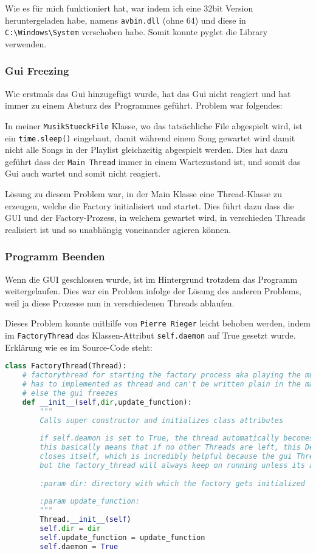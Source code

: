 Wie es für mich funktioniert hat, war indem ich eine 32bit Version heruntergeladen habe, namens \verb|avbin.dll| (ohne 64) und diese in \verb|C:\Windows\System| verschoben habe. Somit konnte pyglet die Library verwenden.

\clearpage

\subsubsection{Gui Freezing}
Wie erstmals das Gui hinzugefügt wurde, hat das Gui nicht reagiert und hat immer zu einem Absturz des Programmes geführt. Problem war folgendes: 

In meiner \verb|MusikStueckFile| Klasse, wo das tatsächliche File abgespielt wird, ist ein \verb|time.sleep()| eingebaut, damit während einem Song gewartet wird damit nicht alle Songs in der Playlist gleichzeitig abgespielt werden. Dies hat dazu geführt dass der \verb|Main Thread| immer in einem Wartezustand ist, und somit das Gui auch wartet und somit nicht reagiert.

Lösung zu diesem Problem war, in der Main Klasse eine Thread-Klasse zu erzeugen, welche die Factory initialisiert und startet. Dies führt dazu dass die GUI und der Factory-Prozess, in welchem gewartet wird, in verschieden Threads realisiert ist und so unabhängig voneinander agieren können. 

\subsubsection{Programm Beenden}
Wenn die GUI geschlossen wurde, ist im Hintergrund trotzdem das Programm weitergelaufen. Dies war ein Problem infolge der Lösung des anderen Problems, weil ja diese Prozesse nun in verschiedenen Threads ablaufen.

Dieses Problem konnte mithilfe von \verb|Pierre Rieger| leicht behoben werden, indem im \verb|FactoryThread| das Klassen-Attribut \verb|self.daemon| auf True gesetzt wurde. Erklärung wie es im Source-Code steht:

\begin{lstlisting}[language=Python]
class FactoryThread(Thread):
	# factorythread for starting the factory process aka playing the music
	# has to implemented as thread and can't be written plain in the main thread because
	# else the gui freezes
	def __init__(self,dir,update_function):
		"""
		Calls super constructor and initializes class attributes
		
		if self.deamon is set to True, the thread automatically becomes a 'Deamon-Thread'
		this basically means that if no other Threads are left, this Deamon Threads also automatically
		closes itself, which is incredibly helpful because the gui Thread gets terminated by closing the window
		but the factory_thread will always keep on running unless its a daemon thread
		
		:param dir: directory with which the factory gets initialized
		
		:param update_function:
		"""
		Thread.__init__(self)
		self.dir = dir
		self.update_function = update_function
		self.daemon = True
\end{lstlisting}